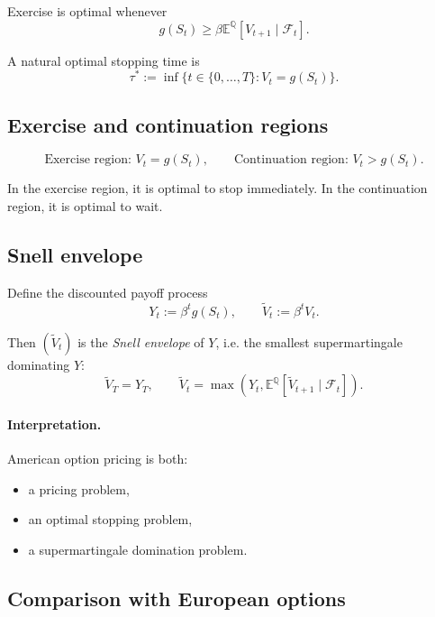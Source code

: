 \documentclass[11pt]{article}
\newcommand{\Qbb}{\mathbb{Q}}
\newcommand{\E}{\mathbb{E}}
\newcommand{\1}{\mathbf{1}}
\theoremstyle{plain}
\theoremstyle{definition}
\theoremstyle{remark}
\begin{document}
Exercise is optimal whenever
\[
\boxed{
g(S_t)\ge \beta\E^{\Qbb}[V_{t+1}\mid\mathcal{F}_t].
}
\]

A natural optimal stopping time is
\[
\boxed{
\tau^*:=\inf\{t\in\{0,\dots,T\}:V_t=g(S_t)\}.
}
\]

\subsection{Exercise and continuation regions}

\[
\boxed{
\text{Exercise region: } V_t=g(S_t),
\qquad
\text{Continuation region: } V_t>g(S_t).
}
\]

In the exercise region, it is optimal to stop immediately.
In the continuation region, it is optimal to wait.

\subsection{Snell envelope}

Define the discounted payoff process
\[
Y_t:=\beta^t g(S_t),
\qquad
\widetilde V_t:=\beta^t V_t.
\]

Then \((\widetilde V_t)\) is the \emph{Snell envelope} of \(Y\), i.e. the smallest supermartingale dominating \(Y\):
\[
\boxed{
\widetilde V_T=Y_T,
\qquad
\widetilde V_t=\max\!\left(Y_t,\E^{\Qbb}[\widetilde V_{t+1}\mid\mathcal{F}_t]\right).
}
\]

\paragraph{Interpretation.}
American option pricing is both:
\begin{itemize}[leftmargin=1.4em]
\item a pricing problem,
\item an optimal stopping problem,
\item a supermartingale domination problem.
\end{itemize}

\subsection{Comparison with European options}
\end{document}
